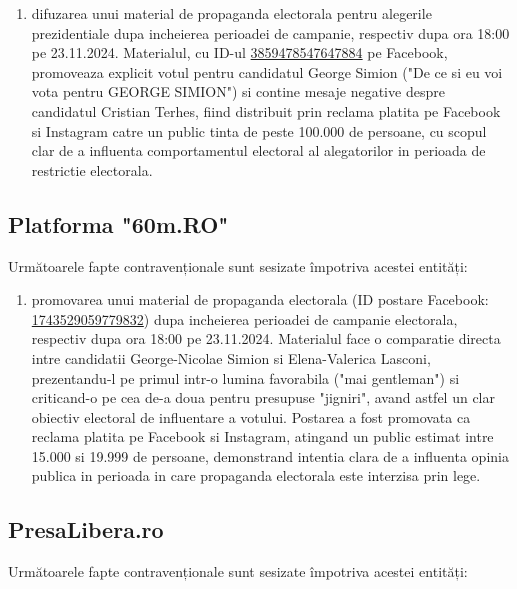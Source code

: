 \documentclass[a4paper,12pt]{article}
\begin{document}
\begin{enumerate}[leftmargin=*, label=\arabic*.)]
    \item difuzarea unui material de propaganda electorala pentru alegerile prezidentiale dupa incheierea perioadei de campanie, respectiv dupa ora 18:00 pe 23.11.2024. Materialul, cu ID-ul \href{https://www.facebook.com/ads/library/?id=3859478547647884}{3859478547647884} pe Facebook, promoveaza explicit votul pentru candidatul George Simion ("De ce si eu voi vota pentru GEORGE SIMION") si contine mesaje negative despre candidatul Cristian Terhes, fiind distribuit prin reclama platita pe Facebook si Instagram catre un public tinta de peste 100.000 de persoane, cu scopul clar de a influenta comportamentul electoral al alegatorilor in perioada de restrictie electorala.
\end{enumerate}

\vspace{0.5cm}

\subsection{Platforma "60m.RO"}
Următoarele fapte contravenționale sunt sesizate împotriva acestei entități:

\begin{enumerate}[leftmargin=*, label=\arabic*.)]
    \item promovarea unui material de propaganda electorala (ID postare Facebook: \href{https://www.facebook.com/ads/library/?id=1743529059779832}{1743529059779832}) dupa incheierea perioadei de campanie electorala, respectiv dupa ora 18:00 pe 23.11.2024. Materialul face o comparatie directa intre candidatii George-Nicolae Simion si Elena-Valerica Lasconi, prezentandu-l pe primul intr-o lumina favorabila ("mai gentleman") si criticand-o pe cea de-a doua pentru presupuse "jigniri", avand astfel un clar obiectiv electoral de influentare a votului. Postarea a fost promovata ca reclama platita pe Facebook si Instagram, atingand un public estimat intre 15.000 si 19.999 de persoane, demonstrand intentia clara de a influenta opinia publica in perioada in care propaganda electorala este interzisa prin lege.
\end{enumerate}

\vspace{0.5cm}

\subsection{PresaLibera.ro}
Următoarele fapte contravenționale sunt sesizate împotriva acestei entități:
\end{document}
